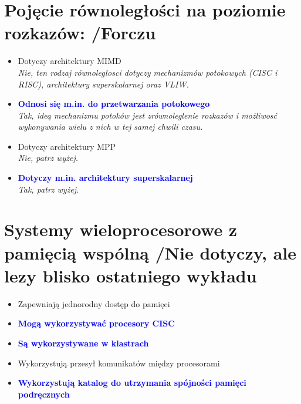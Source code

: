 \documentclass[a4paper,twoside]{article}
\begin{document}
\section{Pojęcie równoległości na poziomie rozkazów: {\small /Forczu}}
	\begin{itemize}
    \item Dotyczy architektury MIMD\\
    {\small \emph{Nie, ten rodzaj równoległosci dotyczy mechanizmów potokowych (CISC i RISC), architektury superskalarnej oraz VLIW.}}
    \item \textcolor{Blue}{\textbf{Odnosi się m.in. do przetwarzania potokowego}}\\
    {\small \emph{Tak, ideą mechanizmu potoków jest zrównoleglenie rozkazów i możliwosć wykonywania wielu z nich w tej samej chwili czasu.}}
    \item Dotyczy architektury MPP\\
    {\small \emph{Nie, patrz wyżej.}}
    \item \textcolor{Blue}{\textbf{Dotyczy m.in. architektury superskalarnej}}\\
    {\small \emph{Tak, patrz wyżej.}}
    \end{itemize}

\section{Systemy wieloprocesorowe z pamięcią wspólną {\small /Nie dotyczy, ale lezy blisko ostatniego wykładu}}
	\begin{itemize}
    \item Zapewniają jednorodny dostęp do pamięci
    \item \textcolor{Blue}{\textbf{Mogą wykorzystywać procesory CISC}}
    \item \textcolor{Blue}{\textbf{Są wykorzystywane w klastrach}}
    \item Wykorzystują przesył komunikatów między procesorami
    \item \textcolor{Blue}{\textbf{Wykorzystują katalog do utrzymania spójności pamięci podręcznych}}
    \end{itemize}

\end{document}
